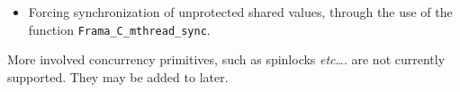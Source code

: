 \documentclass{frama-c-book}
\def\etc{\emph{etc}\ldots}
\begin{document}
\begin{description}
\begin{itemize}
    This function takes as first argument a constant string will be
    used as a message, and a number of \C values that will be printed
    after the message. It can be used to show in the control-flow graph any information
    relevant to the analysis, and does not modify the memory state at all.

  \item Forcing synchronization of unprotected shared values, through
    the use of the function \verb+Frama_C_mthread_sync+.

  \end{itemize}


\end{description}

More involved concurrency primitives, such as spinlocks \etc. are not
currently supported. They may be added to \mthread later.




\end{document}
